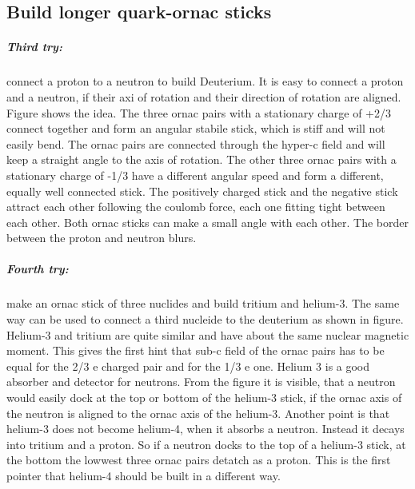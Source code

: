 \subsection{Build longer quark-ornac sticks}
\subparagraph{Third try:} 
connect a proton to a neutron to build Deuterium. It is easy to connect a proton and a neutron, if their axi of rotation and their direction of rotation are aligned. Figure shows the idea. The three ornac pairs with a stationary charge of +2/3 connect together and form an angular stabile stick, which is stiff and will not easily bend.  The ornac pairs are connected through the hyper-c field and will keep a straight angle to the axis of rotation. The other three ornac pairs with a stationary charge of -1/3 have a different angular speed and form a different, equally well connected stick. The positively charged stick and the negative stick attract each other following the coulomb force, each one fitting tight between each other. Both ornac sticks can make a small angle with each other. The border between the proton and neutron blurs.

\subparagraph{Fourth try:} 
make an ornac stick of three nuclides and build tritium and helium-3. The same way can be used to connect a third nucleide to the deuterium as shown in figure. Helium-3 and tritium are quite similar and have about the same nuclear magnetic moment. This gives the first hint that sub-c field of the ornac pairs has to be equal for the 2/3 e charged pair and for the 1/3 e one. Helium 3 is a good absorber and detector for neutrons. From the figure it is visible, that a neutron would easily dock at the top or bottom of the helium-3 stick, if the ornac axis of the neutron is aligned to the ornac axis of the helium-3. Another point is that helium-3 does not become helium-4, when it absorbs a neutron. Instead it decays into tritium and a proton. So if a neutron docks to the top of a helium-3 stick, at the bottom the lowwest three ornac pairs detatch as a proton. This is the first pointer that helium-4 should be built in a different way.

